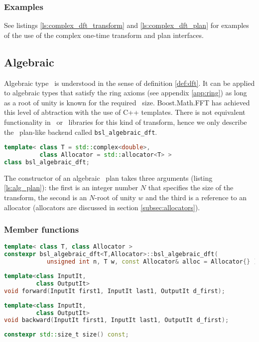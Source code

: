 \subsubsection*{Examples}
See listings \ref{ls:complex_dft_transform} and \ref{ls:complex_dft_plan} 
for examples of the use of the complex one-time transform and plan interfaces.

\subsection{Algebraic \dft}
Algebraic type \dft\ is understood in the sense of definition \ref{def:dft}.
It can be applied to algebraic types that satisfy the ring axioms (see appendix
\ref{app:ring}) as long as a root of unity is known for the required \dft\ size.
Boost.Math.FFT has achieved this level of abtraction with the use of C++
templates. There is not equivalent functionality in \gsl\ or \fftw\ libraries
for this kind of transform, hence we only describe the \bsl\ plan-like backend
called \verb|bsl_algebraic_dft|.
\begin{lstlisting}[language=C++,caption=Algebraic plan.,label=ls:alg_plan]
template< class T = std::complex<double>, 
          class Allocator = std::allocator<T> >
class bsl_algebraic_dft;
\end{lstlisting}
The constructor of an algebraic \dft\ plan takes three arguments (listing
\ref{ls:alg_plan}): the first is an integer number $N$ that specifies the size of
the transform, the second is an $N$-root of unity $w$ and the third is a
reference to an allocator (allocators are discussed in section
\ref{subsec:allocators}).

\subsubsection*{Member functions}
\begin{lstlisting}[language=C++,caption=Algebraic plan constructor.]
template< class T, class Allocator >
constexpr bsl_algebraic_dft<T,Allocator>::bsl_algebraic_dft(
            unsigned int n, T w, const Allocator& alloc = Allocator{} );
\end{lstlisting}
\begin{lstlisting}[language=C++,caption=Algebraic plan forward function.]
template<class InputIt,
         class OutputIt>
void forward(InputIt first1, InputIt last1, OutputIt d_first);
\end{lstlisting}
\begin{lstlisting}[language=C++,caption=Algebraic plan backward function.]
template<class InputIt,
         class OutputIt>
void backward(InputIt first1, InputIt last1, OutputIt d_first);
\end{lstlisting}
\begin{lstlisting}[language=C++,caption=Size.]
constexpr std::size_t size() const;
\end{lstlisting}

